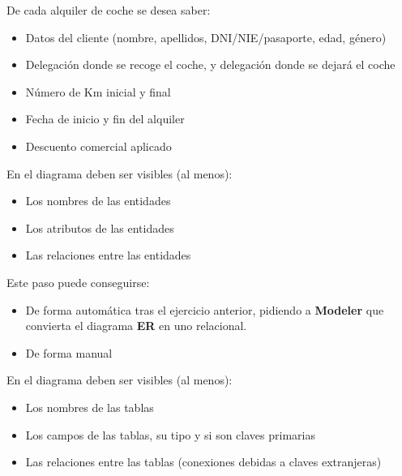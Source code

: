 De cada alquiler de coche se desea saber:
\begin{itemize}
\item Datos del cliente (nombre, apellidos, DNI/NIE/pasaporte, edad,
género)
\item  Delegación donde se recoge el coche, y delegación donde se
dejará el coche
\item  Número de Km inicial y final
\item  Fecha de inicio y fin del alquiler
\item  Descuento comercial aplicado
\end{itemize}


\begin{homeworkProblem}
  En el diagrama deben ser visibles (al menos):
  \begin{itemize}
  \item Los nombres de las entidades
  \item Los atributos de las entidades
  \item Las relaciones entre las entidades
  \end{itemize}

\end{homeworkProblem}

\begin{homeworkProblem}
  Este paso puede conseguirse:
  \begin{itemize}
  \item De forma automática tras el ejercicio anterior, pidiendo a \textbf{Modeler} que convierta el diagrama \textbf{ER} en uno relacional.
  \item De forma manual
  \end{itemize}

  En el diagrama deben ser visibles (al menos):
  \begin{itemize}
  \item Los nombres de las tablas
  \item Los campos de las tablas, su tipo y si son claves primarias
  \item Las relaciones entre las tablas (conexiones debidas a claves extranjeras)  
  \end{itemize}
  
\end{homeworkProblem}


